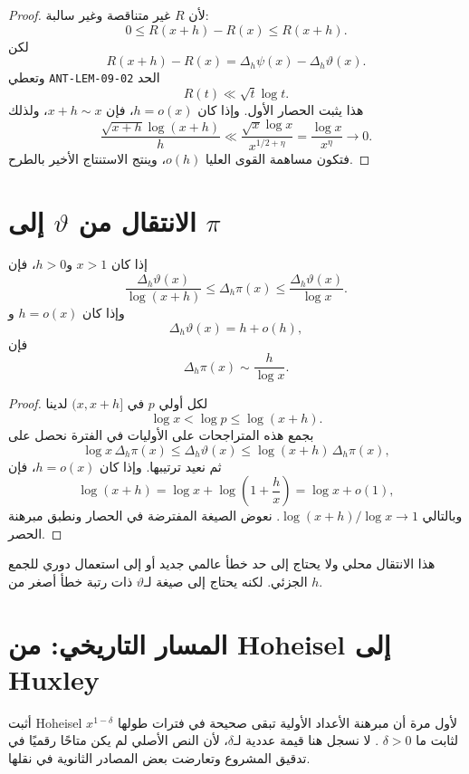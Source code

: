 \begin{proof}
لأن \(R\) غير متناقصة وغير سالبة:
\[
0\le R(x+h)-R(x)\le R(x+h).
\]
لكن
\[
R(x+h)-R(x)
=
\Delta_h\psi(x)-\Delta_h\vartheta(x).
\]
وتعطي \textenglish{\texttt{ANT-LEM-09-02}} الحد
\[
R(t)\ll\sqrt t\log t.
\]
هذا يثبت الحصار الأول. وإذا كان \(h=o(x)\)، فإن \(x+h\sim x\)، ولذلك
\[
\frac{\sqrt{x+h}\log(x+h)}{h}
\ll
\frac{\sqrt{x}\log x}{x^{1/2+\eta}}
=
\frac{\log x}{x^\eta}
\longrightarrow0.
\]
فتكون مساهمة القوى العليا \(o(h)\)، وينتج الاستنتاج الأخير بالطرح.
\end{proof}

\section{الانتقال من \(\vartheta\) إلى \(\pi\)}

\begin{proposition}
\label{prop:theta-to-pi-short-interval}
\provedhere
إذا كان \(x>1\) و\(h>0\)، فإن
\[
\frac{\Delta_h\vartheta(x)}{\log(x+h)}
\le
\Delta_h\pi(x)
\le
\frac{\Delta_h\vartheta(x)}{\log x}.
\]
وإذا كان \(h=o(x)\) و
\[
\Delta_h\vartheta(x)=h+o(h),
\]
فإن
\[
\Delta_h\pi(x)
\sim
\frac{h}{\log x}.
\]
\end{proposition}

\begin{proof}
لكل أولي \(p\) في \((x,x+h]\) لدينا
\[
\log x<\log p\le\log(x+h).
\]
بجمع هذه المتراجحات على الأوليات في الفترة نحصل على
\[
\log x\,\Delta_h\pi(x)
\le
\Delta_h\vartheta(x)
\le
\log(x+h)\,\Delta_h\pi(x),
\]
ثم نعيد ترتيبها. وإذا كان \(h=o(x)\)، فإن
\[
\log(x+h)=\log x+\log\!\left(1+\frac hx\right)
=\log x+o(1),
\]
وبالتالي \(\log(x+h)/\log x\to1\). نعوض الصيغة المفترضة في الحصار ونطبق مبرهنة الحصر.
\end{proof}

\begin{remark}
هذا الانتقال محلي ولا يحتاج إلى حد خطأ عالمي جديد أو إلى استعمال دوري للجمع الجزئي. لكنه يحتاج إلى صيغة لـ\(\vartheta\) ذات رتبة خطأ أصغر من \(h\).
\end{remark}

\section{المسار التاريخي: من Hoheisel إلى Huxley}

أثبت Hoheisel لأول مرة أن مبرهنة الأعداد الأولية تبقى صحيحة في فترات طولها \(x^{1-\delta}\) لثابت ما \(\delta>0\) \cite{Hoheisel1930}. لا نسجل هنا قيمة عددية لـ\(\delta\)، لأن النص الأصلي لم يكن متاحًا رقميًا في تدقيق المشروع وتعارضت بعض المصادر الثانوية في نقلها.


